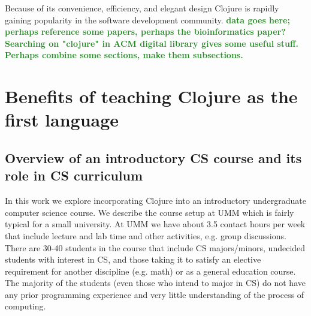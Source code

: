 \documentclass[submission,copyright,creativecommons]{eptcs}
\newcommand{\allcomments}[1]{{#1}}
\newcommand{\elenacomment}[1]{{\bf \textcolor{ForestGreen}{\allcomments{{#1}}}}}
\newcommand{\stephencomment}[1]{{\bf \color{StephensBlue}{\allcomments{{#1}}}}} %
\newcommand{\joecomment}[1]{{\bf \color{JoesGold}{\allcomments{{#1}}}}}
\begin{document}
Because of its convenience, efficiency, and elegant design 
Clojure is rapidly gaining popularity in the software development community. \elenacomment{data goes here; perhaps reference some papers, perhaps the bioinformatics paper? Searching on "clojure" in ACM digital library gives some useful stuff.}
\elenacomment{Perhaps combine some sections, make them subsections.}

\section{Benefits of teaching Clojure as the first language}

\subsection{Overview of an introductory CS course and its role in CS curriculum}
In this work we explore incorporating Clojure into an introductory undergraduate computer science course. We describe the course setup at UMM which is fairly typical for a small university. At UMM we have about 3.5 contact hours per week that include lecture and lab time and other activities, e.g. group discussions. There are 30-40 students in the course that  include CS majors/minors, undecided students with  interest in CS, and those taking it to satisfy an elective requirement for another discipline (e.g. math) or as a general education course. The majority of the students (even those who intend to major in CS) do not have any prior programming experience and very little understanding of the process of computing. 
\end{document}
